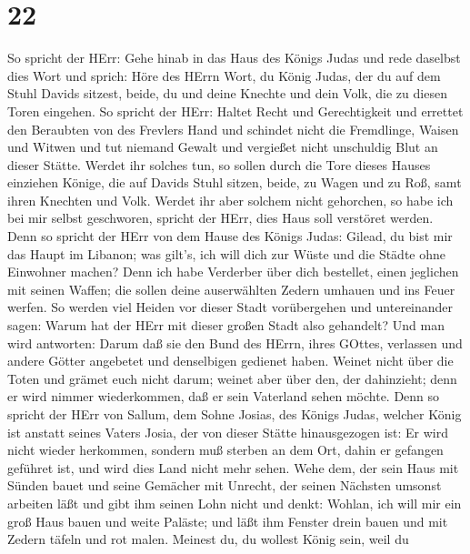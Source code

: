 \hypertarget{section-21}{%
\section{22}\label{section-21}}

 So spricht der HErr: Gehe hinab in das Haus des Königs
Judas und rede daselbst dies Wort  und sprich: Höre des
HErrn Wort, du König Judas, der du auf dem Stuhl Davids sitzest, beide,
du und deine Knechte und dein Volk, die zu diesen Toren eingehen.
 So spricht der HErr: Haltet Recht und Gerechtigkeit und
errettet den Beraubten von des Frevlers Hand und schindet nicht die
Fremdlinge, Waisen und Witwen und tut niemand Gewalt und vergießet nicht
unschuldig Blut an dieser Stätte.  Werdet ihr solches tun,
so sollen durch die Tore dieses Hauses einziehen Könige, die auf Davids
Stuhl sitzen, beide, zu Wagen und zu Roß, samt ihren Knechten und Volk.
 Werdet ihr aber solchem nicht gehorchen, so habe ich bei
mir selbst geschworen, spricht der HErr, dies Haus soll verstöret
werden.  Denn so spricht der HErr von dem Hause des Königs
Judas: Gilead, du bist mir das Haupt im Libanon; was gilt's, ich will
dich zur Wüste und die Städte ohne Einwohner machen?  Denn
ich habe Verderber über dich bestellet, einen jeglichen mit seinen
Waffen; die sollen deine auserwählten Zedern umhauen und ins Feuer
werfen.  So werden viel Heiden vor dieser Stadt vorübergehen
und untereinander sagen: Warum hat der HErr mit dieser großen Stadt also
gehandelt?  Und man wird antworten: Darum daß sie den Bund
des HErrn, ihres GOttes, verlassen und andere Götter angebetet und
denselbigen gedienet haben.  Weinet nicht über die Toten
und grämet euch nicht darum; weinet aber über den, der dahinzieht; denn
er wird nimmer wiederkommen, daß er sein Vaterland sehen möchte.
 Denn so spricht der HErr von Sallum, dem Sohne Josias, des
Königs Judas, welcher König ist anstatt seines Vaters Josia, der von
dieser Stätte hinausgezogen ist: Er wird nicht wieder herkommen,
 sondern muß sterben an dem Ort, dahin er gefangen geführet
ist, und wird dies Land nicht mehr sehen.  Wehe dem, der
sein Haus mit Sünden bauet und seine Gemächer mit Unrecht, der seinen
Nächsten umsonst arbeiten läßt und gibt ihm seinen Lohn nicht
 und denkt: Wohlan, ich will mir ein groß Haus bauen und
weite Paläste; und läßt ihm Fenster drein bauen und mit Zedern täfeln
und rot malen.  Meinest du, du wollest König sein, weil du
